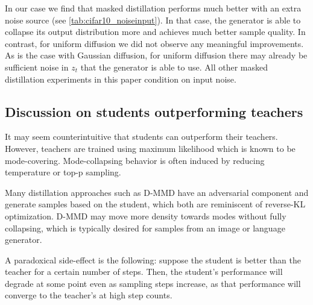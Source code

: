In our case we find that masked distillation performs much better with an extra noise source (see \autoref{tab:cifar10_noiseinput}). In that case, the generator is able to collapse its output distribution more and achieves much better sample quality. In contrast, for uniform diffusion we did not observe any meaningful improvements. As is the case with Gaussian diffusion, for uniform diffusion there may already be sufficient noise in $z_t$ that the generator is able to use. All other masked distillation experiments in this paper condition on input noise.

\subsection{Discussion on students outperforming teachers}
It may seem counterintuitive that students can outperform their teachers. However, teachers are trained using maximum likelihood which is known to be mode-covering. Mode-collapsing behavior is often induced by reducing temperature or top-p sampling.

Many distillation approaches such as D-MMD have an adversarial component and generate samples based on the student, which both are reminiscent of reverse-KL optimization. D-MMD may move more density towards modes without fully collapsing, which is typically desired for samples from an image or language generator.

A paradoxical side-effect is the following: suppose the student is better than the teacher for a certain number of steps. Then, the student's performance will degrade at some point even as sampling steps increase, as that performance will converge to the teacher's at high step counts.
